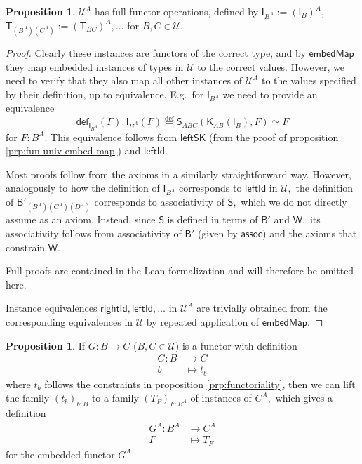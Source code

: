\documentclass[a4paper]{article}
\theoremstyle{definition}
\newtheorem{proposition}[definition]{Proposition}
\theoremstyle{remark}
\renewcommand{\equiv}{\simeq}
\newcommand{\U}{\mathcal{U}}
\newcommand{\nm}{\mathsf}
\newcommand{\fndef}[1]{\nm{def}_{#1}}
\newcommand{\combinator}{\nm}
\newcommand{\idFun}{\combinator{I}}
\newcommand{\revAppFun}{\combinator{T}}
\newcommand{\constFun}{\combinator{K}}
\newcommand{\compFun}{\combinator{B'}}
\newcommand{\dupFun}{\combinator{W}}
\newcommand{\revSubstFun}{\combinator{S}}
\newcommand{\eqDef}{\overset{\text{def}}{=}}
\begin{document}
\begin{proposition}
  \label{prp:fun-univ-full-funop}
  $\U^A$ has full functor operations, defined by $\idFun_{B^A} := (\idFun_B)^A,$
  $\revAppFun_{(B^A)(C^A)} := (\revAppFun_{BC})^A, \ldots$ for $B,C \in \U.$
\end{proposition}
\vspace{-1ex}
\begin{proof}
  Clearly these instances are functors of the correct type, and by $\nm{embedMap}$
  they map embedded instances of types in $\U$ to the correct values. However, we
  need to verify that they also map all other instances of $\U^A$ to the values
  specified by their definition, up to equivalence. E.g.\ for $\idFun_{B^A}$ we
  need to provide an equivalence
  \[\fndef{\idFun_{B^A}}(F) : \idFun_{B^A}(F) \eqDef \revSubstFun_{ABC}(\constFun_{AB}(\idFun_B),F) \equiv F\]
  for $F : B^A.$ This equivalence follows from $\nm{leftSK}$ (from the proof of
  proposition \ref{prp:fun-univ-embed-map}) and $\nm{leftId}.$

  Most proofs follow from the axioms in a similarly straightforward way. However,
  analogously to how the definition of $\idFun_{B^A}$ corresponds to $\nm{leftId}$
  in $\U,$ the definition of $\compFun_{(B^A)(C^A)(D^A)}$ corresponds to
  associativity of $\revSubstFun,$ which we do not directly assume as an axiom.
  Instead, since $\revSubstFun$ is defined in terms of $\compFun$ and $\dupFun,$ its
  associativity follows from associativity of $\compFun$ (given by $\nm{assoc}$)
  and the axioms that constrain $\dupFun.$

  Full proofs are contained in the Lean formalization and will therefore be
  omitted here.

  Instance equivalences $\nm{rightId}, \nm{leftId}, \ldots$ in $\U^A$ are trivially
  obtained from the corresponding equivalences in $\U$ by repeated application of
  $\nm{embedMap}.$
\end{proof}

\begin{proposition}
  \label{prp:fun-univ-lift-fun}
  If $G : B \to C$ ($B,C \in \U$) is a functor with definition
  \begin{align*}
    G : B &\to     C\\
        b &\mapsto t_b
  \end{align*}
  where $t_b$ follows the constraints in proposition \ref{prp:functoriality},
  then we can lift the family $(t_b)_{b : B}$ to a family $(T_F)_{F : B^A}$ of
  instances of $C^A,$ which gives a definition
  \begin{align*}
    G^A : B^A &\to     C^A\\
          F   &\mapsto T_F
  \end{align*}
  for the embedded functor $G^A.$
\end{proposition}
\end{document}
